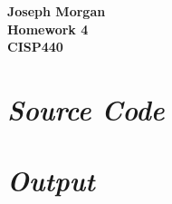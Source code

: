 \documentclass[12pt,titlepage]{article}
\begin{document}
\begin{titlepage}
	\centering
	\vfill
	{\bfseries\Large
		Joseph Morgan\\
		\large
		Homework 4\\
		\vskip2cm
		CISP440\\
	}
	\vfill
	\vfill
	\vfill
\end{titlepage}
\section{\textit{Source Code}}

\section{\textit{Output}}

\end{document}
